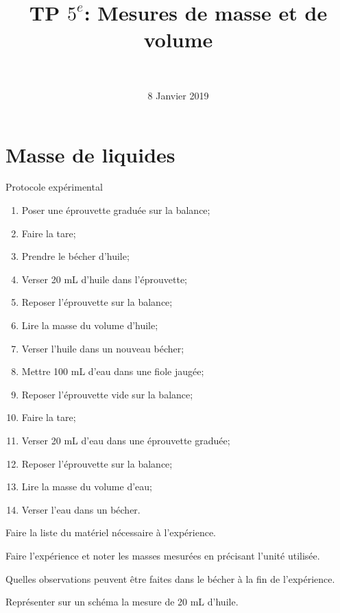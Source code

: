 \documentclass[a4paper,11pt]{exam}
\author{\ }
\date{8 Janvier 2019}
\title{TP $5^e$: Mesures de masse et de volume}
\begin{document}
	\maketitle

\section{Masse de liquides}\label{part:liquide}

\begin{doc}
	\caption{Protocole expérimental}
	\label{doc:proto1}
	\begin{multicols}{2}
			
		\begin{enumerate}[label=\arabic*)]
			
			\item Poser une éprouvette graduée sur la balance;
			\item Faire la tare;
			\item Prendre le bécher d'huile;
			\item Verser 20 mL d'huile dans l'éprouvette;
			\item Reposer l'éprouvette sur la balance;
			\item Lire la masse du volume d'huile;
			\item Verser l'huile dans un nouveau bécher;
			\item Mettre 100 mL d'eau dans une fiole jaugée;
			\item Reposer l'éprouvette vide sur la balance;
			\item Faire la tare;
			\item Verser 20 mL d'eau dans une éprouvette graduée;
			\item Reposer l'éprouvette sur la balance;
			\item Lire la masse du volume d'eau;
			\item Verser l'eau dans un bécher.
			
			
		\end{enumerate}
	\end{multicols}
\end{doc}	


\begin{questions}
	
	
	\question Faire la liste du matériel nécessaire à l'expérience.
	
	\fillwithdottedlines{3cm}
	
	\question Faire l'expérience et noter les masses mesurées en précisant l'unité utilisée.
	
	\fillwithdottedlines{1cm}	
	
	\question Quelles observations peuvent être faites dans le bécher à la fin de l'expérience.
	\fillwithdottedlines{1.5cm}
	
	\question Représenter sur un schéma la mesure de 20 mL d'huile.
	
	\makeemptybox{5.5cm}
\end{questions}
\end{document}
